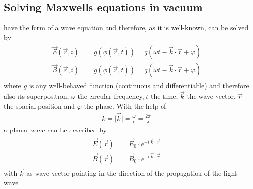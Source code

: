 \subsection{Solving Maxwells equations in vacuum}\label{sec::SolvMaxEqVac}
%
 have the form of a wave equation and therefore, as it is well-known, can be solved by
%
\begin{align}
\begin{split} \label{eq::dgl_solution}
  \vec{E}( \vec{r}, t ) &= g(\phi( \vec{r}, t )) = g( \omega t - \vec{k} \cdot \vec{r} + \varphi)\\
  \vec{B}( \vec{r}, t ) &= g(\phi( \vec{r}, t )) = g( \omega t - \vec{k} \cdot \vec{r} + \varphi )
\end{split}
\end{align}
%
where $g$ is any well-behaved function (continuous and differentiable) and therefore also its superposition, $\omega$ the circular frequency, $t$ the time, $\vec{k}$ the wave vector, $\vec{r}$ the spacial position and $\varphi$ the phase.
%
With the help of
%
\begin{align}
k = \mathopen| \vec{k} \mathclose| = \frac{\omega}{c} =  \frac{2 \pi}{\lambda}
\end{align}
%
a planar wave can be described by
%
\begin{align}
\begin{split} \label{eq::plane_wave}
\vec{E}(\vec{r}) &= \vec{E}_0 \cdot e^{ -i \, \vec{k} \cdot \vec{r} }\\
 \vec{B}(\vec{r}) &= \vec{B}_0 \cdot e^{ -i \, \vec{k} \cdot \vec{r} }
\end{split}
\end{align}
%
with $\vec{k}$ as wave vector pointing in the direction of the propagation of the light wave.
%
%
